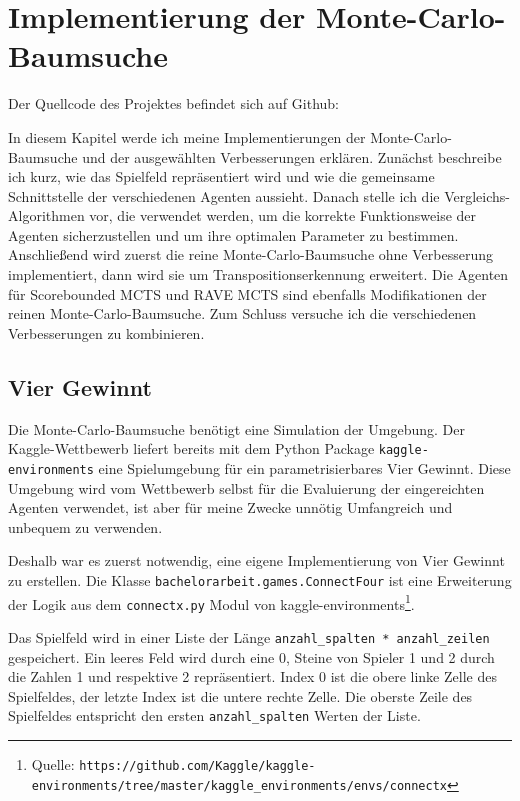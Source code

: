 \section{Implementierung der Monte-Carlo-Baumsuche}
\label{chap:mcts-impl}

Der Quellcode des Projektes befindet sich auf Github: 

In diesem Kapitel werde ich meine Implementierungen der Monte-Carlo-Baumsuche und der ausgewählten Verbesserungen erklären.
Zunächst beschreibe ich kurz, wie das Spielfeld repräsentiert wird und wie die gemeinsame Schnittstelle der verschiedenen Agenten aussieht.
Danach stelle ich die Vergleichs-Algorithmen vor, die verwendet werden, um die korrekte Funktionsweise der Agenten sicherzustellen und um ihre optimalen Parameter zu bestimmen.
Anschließend wird zuerst die reine Monte-Carlo-Baumsuche ohne Verbesserung implementiert, dann wird sie um Transpositionserkennung erweitert.
Die Agenten für Scorebounded MCTS und RAVE MCTS sind ebenfalls Modifikationen der reinen Monte-Carlo-Baumsuche.
Zum Schluss versuche ich die verschiedenen Verbesserungen zu kombinieren.

\subsection{Vier Gewinnt}
\label{chap:viergewinnt-impl}
Die Monte-Carlo-Baumsuche benötigt eine Simulation der Umgebung.
Der Kaggle-Wettbewerb liefert bereits mit dem Python Package \verb|kaggle-environments| eine Spielumgebung für ein parametrisierbares Vier Gewinnt.
Diese Umgebung wird vom Wettbewerb selbst für die Evaluierung der eingereichten Agenten verwendet, ist aber für meine Zwecke unnötig Umfangreich und unbequem zu verwenden.

Deshalb war es zuerst notwendig, eine eigene Implementierung von Vier Gewinnt zu erstellen.
Die Klasse \verb|bachelorarbeit.games.ConnectFour| ist eine Erweiterung der Logik aus dem \verb|connectx.py| Modul von kaggle-environments\footnote{Quelle: \texttt{https://github.com/Kaggle/kaggle-environments/tree/master/kaggle\_environments/envs/connectx}}.

Das Spielfeld wird in einer Liste der Länge \verb|anzahl_spalten * anzahl_zeilen| gespeichert.
Ein leeres Feld wird durch eine 0, Steine von Spieler 1 und 2 durch die Zahlen 1 und respektive 2 repräsentiert.
Index 0 ist  die obere linke Zelle des Spielfeldes, der letzte Index ist die untere rechte Zelle.
Die oberste Zeile des Spielfeldes entspricht den ersten \verb|anzahl_spalten| Werten der Liste.

